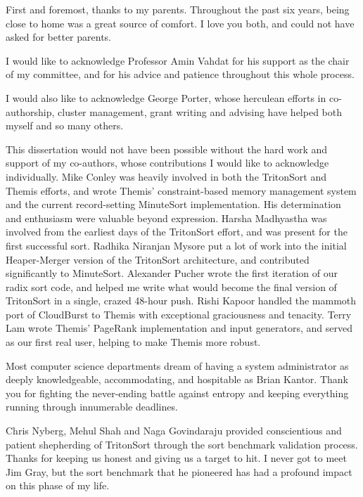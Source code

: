 \begin{acknowledgements}

First and foremost, thanks to my parents. Throughout the past six years, being
close to home was a great source of comfort. I love you both, and could not
have asked for better parents.

I would like to acknowledge Professor Amin Vahdat for his support as the chair
of my committee, and for his advice and patience throughout this whole
process.

I would also like to acknowledge George Porter, whose herculean efforts in
co-authorship, cluster management, grant writing and advising have helped
both myself and so many others.

This dissertation would not have been possible without the hard work and
support of my co-authors, whose contributions I would like to acknowledge
individually. Mike Conley was heavily involved in both the TritonSort and
Themis efforts, and wrote Themis' constraint-based memory management system and
the current record-setting MinuteSort implementation. His determination and
enthusiasm were valuable beyond expression.  Harsha Madhyastha was involved
from the earliest days of the TritonSort effort, and was present for the first
successful sort. Radhika Niranjan Mysore put a lot of work into the initial
Heaper-Merger version of the TritonSort architecture, and contributed
significantly to MinuteSort. Alexander Pucher wrote the first iteration of our
radix sort code, and helped me write what would become the final version of
TritonSort in a single, crazed 48-hour push. Rishi Kapoor handled the mammoth
port of CloudBurst to Themis with exceptional graciousness and tenacity. Terry
Lam wrote Themis' PageRank implementation and input generators, and served as
our first real user, helping to make Themis more robust.

Most computer science departments dream of having a system administrator as
deeply knowledgeable, accommodating, and hospitable as Brian Kantor. Thank you
for fighting the never-ending battle against entropy and keeping everything
running through innumerable deadlines.

Chris Nyberg, Mehul Shah and Naga Govindaraju provided conscientious and
patient shepherding of TritonSort through the sort benchmark validation
process. Thanks for keeping us honest and giving us a target to hit. I never
got to meet Jim Gray, but the sort benchmark that he pioneered has had a
profound impact on this phase of my life.


\end{acknowledgements}
